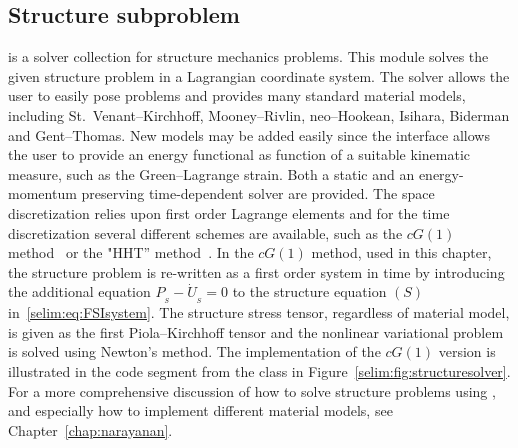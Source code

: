 
\subsection{Structure subproblem}

 is a solver collection for structure mechanics
problems. This module solves the given structure problem in a
Lagrangian coordinate system.  The solver allows the user to easily
pose problems and provides many standard material models, including
St.~Venant--Kirchhoff, Mooney--Rivlin, neo--Hookean, Isihara, Biderman
and Gent--Thomas. New models may be added easily since the interface
allows the user to provide an energy functional as function of a
suitable kinematic measure, such as the Green--Lagrange strain. Both a
static and an energy-momentum preserving time-dependent solver are
provided. The space discretization relies upon first order Lagrange
elements and for the time discretization several different schemes are
available, such as the $cG(1)$
method~\cite{ErikssonEstepHansboEtAl1996, ErikssonEstepJohnson2003} or
the "HHT'' method~\cite{HilberHughesTaylor1977}.  In the $cG(1)$
method, used in this chapter, the structure problem is re-written as a
first order system in time by introducing the additional equation
$P_{_{S}} - \dot{U}_{_{S}} = 0$ to the structure equation $(S)$
in~\eqref{selim:eq:FSIsystem}. The structure stress tensor, regardless
of material model, is given as the first Piola--Kirchhoff tensor and
the nonlinear variational problem is solved using Newton's method.
The implementation of the $cG(1)$ version is illustrated in the code
segment from the class  in
Figure~\ref{selim:fig:structuresolver}. For a more comprehensive
discussion of how to solve structure problems using
, and especially how to implement different material
models, see Chapter~\ref{chap:narayanan}.


